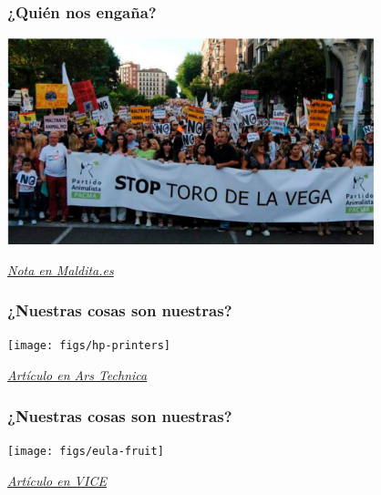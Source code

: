 \documentclass[17pt,aspectratio=169]{beamer}
\begin{document}
\begin{frame}
\frametitle{¿Quién nos engaña?}

\begin{center}
\includegraphics[height=6cm]{figs/san-jorge-asesino-maldita}
\end{center}

  \begin{flushright}
    {\em \small
      \href{https://maldita.es/malditobulo/no-pacma-no-se-ha-manifestado-con-una-pancarta-contra-la-muerte-del-dragon-en-la-fiesta-de-san-jorge/}{Nota en Maldita.es}}
  \end{flushright}

\end{frame}


\begin{frame}
\frametitle{¿Nuestras cosas son nuestras?}

\begin{center}
\texttt{[image: figs/hp-printers]}
\end{center}

  \begin{flushright}
    {\em \small
      \href{https://arstechnica.com/gadgets/2023/03/customers-fume-as-hp-blocks-third-party-ink-from-more-of-its-printers/}{Artículo en Ars Technica}}
  \end{flushright}

\end{frame}


\begin{frame}
\frametitle{¿Nuestras cosas son nuestras?}

\begin{center}
\texttt{[image: figs/eula-fruit]}
\end{center}

  \begin{flushright}
    {\em \small
      \href{https://www.vice.com/en/article/m7jm4y/proprietary-grapes-come-with-draconian-end-user-license-agreement}{Artículo en VICE}}
  \end{flushright}

\end{frame}
\end{document}
